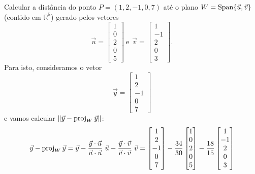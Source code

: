 \documentclass[../livro.tex]{subfiles}  %
\begin{document}
\begin{example}
Calcular a distância do ponto $P = (1,2,-1,0,7)$ até o plano $W = \operatorname{Span}\{\vec{u}, \vec{v}\}$ (contido em $\mathbb{R}^5$) gerado pelos vetores
\begin{equation}
\vec{u} =
\begin{bmatrix}
1 \\ 0 \\ 2 \\ 0 \\ 5
\end{bmatrix} \ \text{e} \ \
\vec{v} = \begin{bmatrix}
1 \\ -1 \\ 2 \\ 0 \\ 3
\end{bmatrix}.
\end{equation} Para isto, consideramos o vetor
\begin{equation}
\vec{y} = \begin{bmatrix}
1 \\ 2 \\ -1 \\ 0 \\ 7
\end{bmatrix}
\end{equation}e vamos calcular $\|\vec{y} - \operatorname{proj}_W \vec{y}\|$:
\begin{equation}
\begin{split}
\vec{y} - \proj_W \vec{y} & = \vec{y} - \frac{\vec{y} \cdot \vec{u}}{\vec{u} \cdot \vec{u}} \ \vec{u} - \frac{\vec{y} \cdot \vec{v}}{\vec{v} \cdot \vec{v}} \ \vec{v}  =
\begin{bmatrix}
1 \\ 2 \\ -1 \\ 0 \\ 7
\end{bmatrix} - \frac{34}{30}
\begin{bmatrix}
1 \\ 0 \\ 2 \\ 0 \\ 5
\end{bmatrix} - \frac{18}{15}
\begin{bmatrix}
1 \\ -1 \\ 2 \\ 0 \\ 3
\end{bmatrix} \\

\end{split}
\end{equation}
\end{example}
\end{document}
